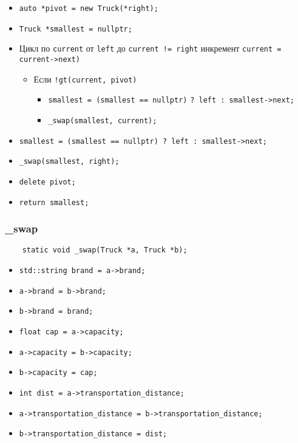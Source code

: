 \begin{itemize}
	\item \verb|auto *pivot = new Truck(*right);|
    \item \verb|Truck *smallest = nullptr;|
	\item Цикл по \verb|current| от \verb|left| до \verb|current != right| инкремент \verb|current = current->next)|
		\begin{itemize}
			\item Если \verb|!gt(current, pivot)|
				\begin{itemize}
					\item \verb|smallest = (smallest == nullptr)|
					\verb|? left : smallest->next;|
					\item \verb|_swap(smallest, current);|
				\end{itemize}
		\end{itemize}
    \item \verb|smallest = (smallest == nullptr) ? left : smallest->next;|
    \item \verb|_swap(smallest, right);|
    \item \verb|delete pivot;|
    \item \verb|return smallest;|
\end{itemize}



\subsubsection*{\_swap}

\begin{lstlisting}
    static void _swap(Truck *a, Truck *b);
\end{lstlisting}

\begin{itemize}
	\item \verb|std::string brand = a->brand;|
    \item \verb|a->brand = b->brand;|
    \item \verb|b->brand = brand;|
    \item \verb|float cap = a->capacity;|
    \item \verb|a->capacity = b->capacity;|
    \item \verb|b->capacity = cap;|
    \item \verb|int dist = a->transportation_distance;|
    \item \verb|a->transportation_distance = b->transportation_distance;|
    \item \verb|b->transportation_distance = dist;|
\end{itemize}



